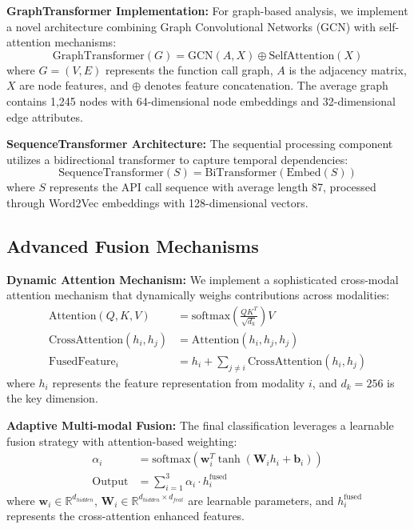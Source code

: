 \documentclass[a4paper,11pt]{article}
\begin{document}
\textbf{GraphTransformer Implementation:}
For graph-based analysis, we implement a novel architecture combining Graph Convolutional Networks (GCN) with self-attention mechanisms:
\begin{equation}
\text{GraphTransformer}(G) = \text{GCN}(A, X) \oplus \text{SelfAttention}(X)
\end{equation}
where $G = (V, E)$ represents the function call graph, $A$ is the adjacency matrix, $X$ are node features, and $\oplus$ denotes feature concatenation. The average graph contains 1,245 nodes with 64-dimensional node embeddings and 32-dimensional edge attributes.

\textbf{SequenceTransformer Architecture:}
The sequential processing component utilizes a bidirectional transformer to capture temporal dependencies:
\begin{equation}
\text{SequenceTransformer}(S) = \text{BiTransformer}(\text{Embed}(S))
\end{equation}
where $S$ represents the API call sequence with average length 87, processed through Word2Vec embeddings with 128-dimensional vectors.

\subsection{Advanced Fusion Mechanisms}

\textbf{Dynamic Attention Mechanism:}
We implement a sophisticated cross-modal attention mechanism that dynamically weighs contributions across modalities:
\begin{align}
\text{Attention}(Q, K, V) &= \text{softmax}\left(\frac{QK^T}{\sqrt{d_k}}\right)V \\
\text{CrossAttention}(h_i, h_j) &= \text{Attention}(h_i, h_j, h_j) \\
\text{FusedFeature}_i &= h_i + \sum_{j \neq i} \text{CrossAttention}(h_i, h_j)
\end{align}
where $h_i$ represents the feature representation from modality $i$, and $d_k = 256$ is the key dimension.

\textbf{Adaptive Multi-modal Fusion:}
The final classification leverages a learnable fusion strategy with attention-based weighting:
\begin{align}
\alpha_i &= \text{softmax}(\mathbf{w}_i^T \tanh(\mathbf{W}_i h_i + \mathbf{b}_i)) \\
\text{Output} &= \sum_{i=1}^{3} \alpha_i \cdot h_i^{\text{fused}}
\end{align}
where $\mathbf{w}_i \in \mathbb{R}^{d_{hidden}}$, $\mathbf{W}_i \in \mathbb{R}^{d_{hidden} \times d_{feat}}$ are learnable parameters, and $h_i^{\text{fused}}$ represents the cross-attention enhanced features.
\end{document}
